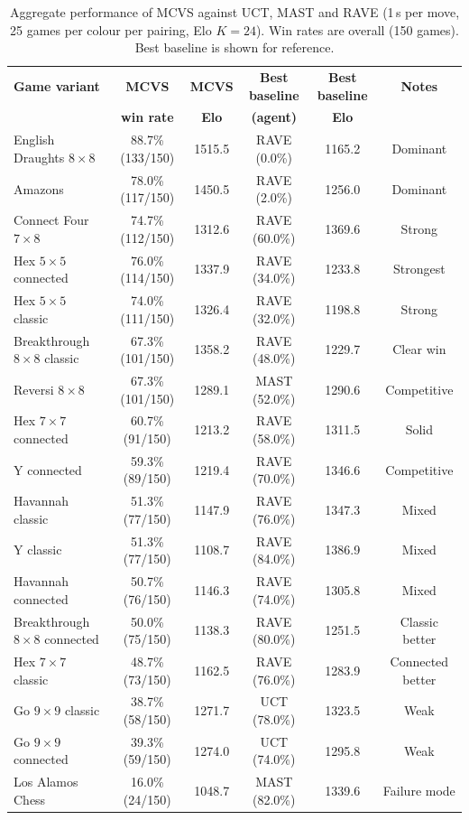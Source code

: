 \documentclass[11pt,a4paper]{article}
\theoremstyle{plain}
\theoremstyle{definition}
\begin{document}
\vspace{0.5em}

\begin{table}[H]
\centering
\caption{Aggregate performance of MCVS against UCT, MAST and RAVE 
(1\,s per move, 25 games per colour per pairing, Elo $K=24$). 
Win rates are overall (150 games). Best baseline is shown for reference.}
\label{tab:mcvs-results}
\small
\setlength{\tabcolsep}{3.5pt}
\begin{tabular}{@{}lccccc@{}}
\toprule
\textbf{Game variant} & \textbf{MCVS} & \textbf{MCVS} & \textbf{Best baseline} & \textbf{Best baseline} & \textbf{Notes} \\
 & \textbf{win rate} & \textbf{Elo} & \textbf{(agent)} & \textbf{Elo} & \\
\midrule
English Draughts $8\times8$ 
  & 88.7\% (133/150) & 1515.5 & RAVE (0.0\%) & 1165.2 & Dominant \\
Amazons 
  & 78.0\% (117/150) & 1450.5 & RAVE (2.0\%) & 1256.0 & Dominant \\
Connect Four $7\times8$ 
  & 74.7\% (112/150) & 1312.6 & RAVE (60.0\%) & 1369.6 & Strong \\
Hex $5\times5$ connected 
  & 76.0\% (114/150) & 1337.9 & RAVE (34.0\%) & 1233.8 & Strongest \\
Hex $5\times5$ classic 
  & 74.0\% (111/150) & 1326.4 & RAVE (32.0\%) & 1198.8 & Strong \\
Breakthrough $8\times8$ classic 
  & 67.3\% (101/150) & 1358.2 & RAVE (48.0\%) & 1229.7 & Clear win \\
Reversi $8\times8$ 
  & 67.3\% (101/150) & 1289.1 & MAST (52.0\%) & 1290.6 & Competitive \\
Hex $7\times7$ connected 
  & 60.7\% (91/150)  & 1213.2 & RAVE (58.0\%) & 1311.5 & Solid \\
Y connected 
  & 59.3\% (89/150)  & 1219.4 & RAVE (70.0\%) & 1346.6 & Competitive \\
Havannah classic 
  & 51.3\% (77/150)  & 1147.9 & RAVE (76.0\%) & 1347.3 & Mixed \\
Y classic 
  & 51.3\% (77/150)  & 1108.7 & RAVE (84.0\%) & 1386.9 & Mixed \\
Havannah connected 
  & 50.7\% (76/150)  & 1146.3 & RAVE (74.0\%) & 1305.8 & Mixed \\
Breakthrough $8\times8$ connected 
  & 50.0\% (75/150)  & 1138.3 & RAVE (80.0\%) & 1251.5 & Classic better \\
Hex $7\times7$ classic 
  & 48.7\% (73/150)  & 1162.5 & RAVE (76.0\%) & 1283.9 & Connected better \\
Go $9\times9$ classic 
  & 38.7\% (58/150)  & 1271.7 & UCT (78.0\%) & 1323.5 & Weak \\
Go $9\times9$ connected 
  & 39.3\% (59/150)  & 1274.0 & UCT (74.0\%) & 1295.8 & Weak \\
Los Alamos Chess 
  & 16.0\% (24/150)  & 1048.7 & MAST (82.0\%) & 1339.6 & Failure mode \\
\bottomrule
\end{tabular}
\end{table}
\newpage
\end{document}
